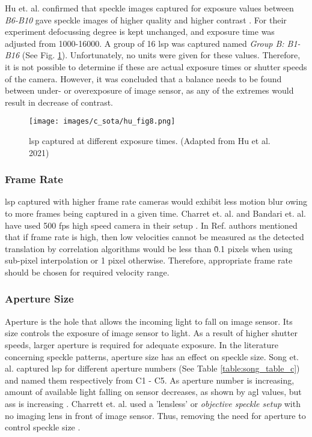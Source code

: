     \vspace{5mm}

    \noindent Hu et. al. confirmed that speckle images captured for exposure values between \emph{B6-B10} gave speckle images of higher quality and higher contrast \noindent \cite{hu}. For their experiment defocussing degree is kept unchanged, and exposure time was adjusted from 1000-16000. A group of 16 \gls{lsp} was captured named \emph{Group B: B1-B16} (See Fig. \ref{fig:hu_fig8}). Unfortunately, no units were given for these values. Therefore, it is not possible to determine if these are actual exposure times or shutter speeds of the camera. However, it was concluded that a balance needs to be found between under- or overexposure of image sensor, as any of the extremes would result in decrease of contrast.

    \begin{figure}[h]
        \centering
        \texttt{[image: images/c\_sota/hu\_fig8.png]}
        \caption{\gls{lsp} captured at different exposure times. (Adapted from Hu et al. 2021) \cite{hu}}
        \label{fig:hu_fig8}
    \end{figure}

    \subsubsection{Frame Rate}\label{Subsubsection:Frame_Rate}
    \Gls{lsp} captured with higher frame rate cameras would exhibit less motion blur owing to more frames being captured in a given time. Charret et. al. and Bandari et. al. have used 500 \gls{fps} high speed camera in their setup \cite{charrett_2018} \cite{bandari}. In Ref. \cite{charrett_mars} authors mentioned that if frame rate is high, then low velocities cannot be measured as the detected translation by correlation algorithms would be less than \~0.1 pixels when using sub-pixel interpolation or 1 pixel otherwise. Therefore, appropriate frame rate should be chosen for required velocity range.

    
    \subsubsection{Aperture Size}
    Aperture is the hole that allows the incoming light to fall on image sensor. Its size controls the exposure of image sensor to light. As a result of higher shutter speeds, larger aperture is required for adequate exposure. In the literature concerning speckle patterns, aperture size has an effect on speckle size. Song et. al. captured \gls{lsp} for different aperture numbers (See Table \ref{table:song_table_c}) and named them respectively from C1 - C5. As aperture number is increasing, amount of available light falling on sensor decreases, as shown by \gls{agl} values, but \gls{ass} is increasing \cite{song}. Charrett et. al. used a 'lensless' or \emph{objective speckle setup} with no imaging lens in front of image sensor. Thus, removing the need for aperture to control speckle size \cite{charrett_2018, francis_autonomous}.
    

